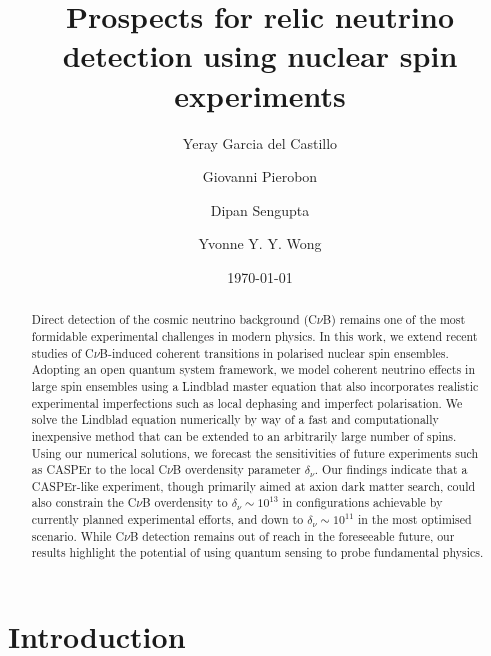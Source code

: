 \documentclass[aps,prd,10pt,twocolumn,superscriptaddress,floatfix,nofootinbib,amsmath,amssymb,altaffilletter,preprintnumbers]{revtex4-1}
\begin{document}
\title{Prospects for relic neutrino detection using nuclear spin experiments}

\author{Yeray Garcia del Castillo}
\author{Giovanni Pierobon}
\author{Dipan Sengupta}
\author{Yvonne Y. Y. Wong}



\date{\today}
\smallskip
\begin{abstract}
Direct detection of the cosmic neutrino background (C$\nu$B) remains one of the most formidable experimental challenges in modern physics. 
In this work, we extend recent studies of C$\nu$B-induced coherent transitions in polarised nuclear spin ensembles. Adopting an open quantum system framework, we model coherent neutrino effects in large spin ensembles using a Lindblad master equation that also incorporates realistic experimental imperfections such as local dephasing and imperfect polarisation.  We solve the Lindblad equation numerically by way of a fast and computationally inexpensive method that can be extended to an arbitrarily large number of spins.  Using our numerical solutions, we forecast the sensitivities of future experiments such as CASPEr to the local C$\nu$B overdensity parameter $\delta_\nu$. Our findings indicate that a CASPEr-like experiment, though primarily aimed at axion dark matter search, could also constrain the C$\nu$B overdensity to $\delta_\nu \sim 10^{13}$ in configurations achievable by currently planned experimental efforts, and down to $\delta_\nu \sim 10^{11}$ in the most optimised scenario. While C$\nu$B detection remains out of reach in the foreseeable future, our results highlight the potential of using quantum sensing to probe fundamental physics.
\end{abstract}


\maketitle



\section{Introduction}
\end{document}
